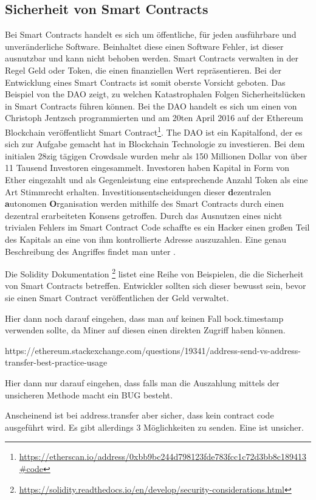\subsection{Sicherheit von Smart Contracts}
Bei Smart Contracts handelt es sich um öffentliche, für jeden ausführbare und unveränderliche Software. Beinhaltet diese einen Software Fehler, ist dieser ausnutzbar und kann nicht behoben werden. Smart Contracts verwalten in der Regel Geld oder Token, die einen finanziellen Wert repräsentieren. Bei der Entwicklung eines Smart Contracts ist somit oberste Vorsicht geboten. Das Beispiel von the DAO zeigt, zu welchen Katastrophalen Folgen Sicherheitslücken in Smart Contracts führen können.
Bei the DAO handelt es sich um einen von Christoph Jentzsch programmierten und am 20ten April 2016 auf der Ethereum Blockchain veröffentlicht Smart Contract\footnote{\url{https://etherscan.io/address/0xbb9bc244d798123fde783fcc1c72d3bb8c189413\#code}}.
The DAO ist ein Kapitalfond, der es sich zur Aufgabe gemacht hat in Blockchain Technologie zu investieren. Bei dem initialen 28zig tägigen Crowdsale wurden mehr als 150 Millionen Dollar von über 11 Tausend Investoren eingesammelt. Investoren haben Kapital in Form von Ether eingezahlt und als Gegenleistung eine entsprechende Anzahl Token als eine Art Stimmrecht erhalten. Investitionsentscheidungen dieser \textbf{d}ezentralen \textbf{a}utonomen \textbf{O}rganisation werden mithilfe des Smart Contracts durch einen dezentral erarbeiteten Konsens getroffen. Durch das Ausnutzen eines nicht trivialen Fehlers im Smart Contract Code schaffte es ein Hacker einen großen Teil des Kapitals an eine von ihm kontrollierte Adresse auszuzahlen. Eine genau Beschreibung des Angriffes findet man unter \cite{eth_dao_hack}.

Die Solidity Dokumentation \footnote{\url{https://solidity.readthedocs.io/en/develop/security-considerations.html}} listet eine Reihe von Beispielen, die die Sicherheit von Smart Contracts betreffen. Entwickler sollten sich dieser bewusst sein, bevor sie einen Smart Contract veröffentlichen der Geld verwaltet.


\if
Hier dann noch darauf eingehen, dass man auf keinen Fall bock.timestamp verwenden sollte, da Miner auf diesen einen direkten Zugriff haben können.

https://ethereum.stackexchange.com/questions/19341/address-send-vs-address-transfer-best-practice-usage

Hier dann nur darauf eingehen, dass falls man die Auszahlung mittels der unsicheren Methode macht ein BUG besteht. 

Anscheinend ist bei address.transfer aber sicher, dass kein contract code ausgeführt wird. Es gibt allerdings 3 Möglichkeiten zu senden.
Eine ist unsicher.


\fi

